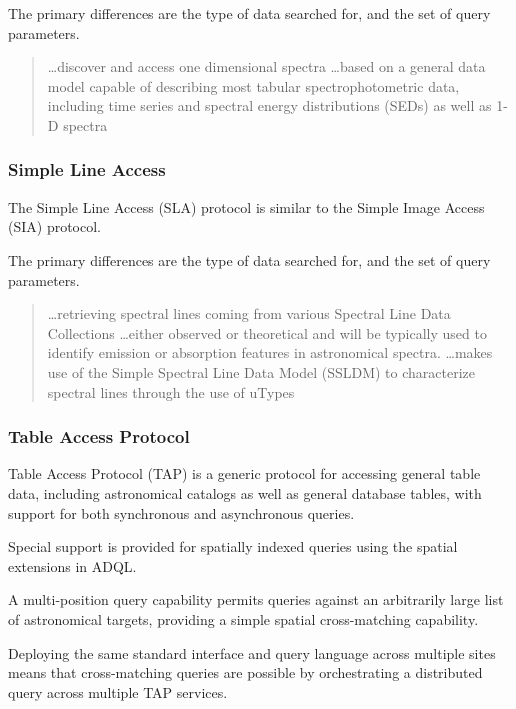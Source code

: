 \documentclass{article}
\begin{document}
The primary differences are the type of data searched for, and the set of query
parameters.

\begin{quote}
\ldots discover and access one dimensional spectra
\ldots based on a general data model capable of describing most tabular
spectrophotometric data, including time series and spectral energy distributions
(SEDs) as well as 1-D spectra
\end{quote}

\subsubsection{Simple Line Access}

The Simple Line Access (SLA) protocol is similar to the Simple Image Access
(SIA) protocol.

The primary differences are the type of data searched for, and the set of query
parameters.

\begin{quote}
\ldots retrieving spectral lines coming from various Spectral Line Data
Collections
\ldots either observed or theoretical and will be typically used to identify
emission or absorption features in astronomical spectra.
\ldots makes use of the Simple Spectral Line Data Model
(SSLDM)  to characterize spectral
lines through the use of uTypes
\end{quote}
  
\subsubsection{Table Access Protocol}

Table Access Protocol (TAP) is a generic protocol for accessing general table
data, including astronomical catalogs as well as general database tables, with
support for both synchronous and asynchronous queries.

Special support is provided for spatially indexed queries using the spatial
extensions in ADQL.

A multi-position query capability permits queries against an arbitrarily large
list of astronomical targets, providing a simple spatial cross-matching
capability.

Deploying the same standard interface and query language across multiple sites
means that cross-matching queries are possible by orchestrating a distributed
query across multiple TAP services.
\end{document}
